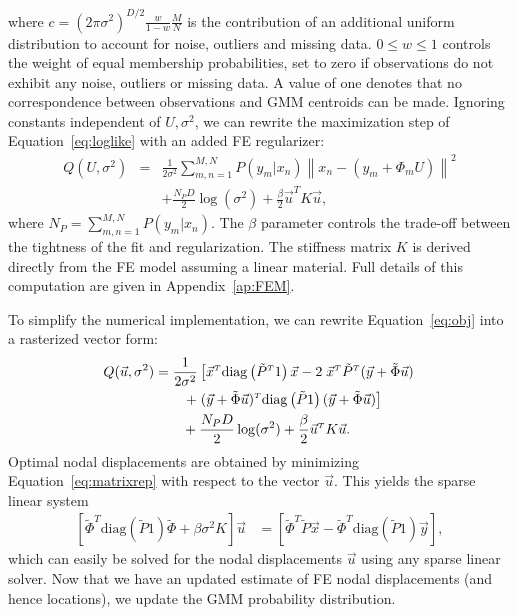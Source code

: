 \documentclass[journal]{IEEEtran}
\newcommand{\trans}[1]{#1^{\scriptscriptstyle T}}
\newcommand{\diag}{\mathrm{diag}}
\begin{document}
where $c=(2\pi\sigma^2)^{D/2}\frac{w}{1-w}\frac{M}{N}$ is the contribution of an additional uniform distribution to account for noise, outliers and missing data. $0{\leq}w{\leq}1$ controls the weight of equal membership probabilities, set to zero if observations do not exhibit any noise, outliers or missing data. A value of one denotes that no correspondence between observations and GMM centroids can be made. Ignoring constants independent of $U,\sigma^2$, we can rewrite the maximization step of Equation~\eqref{eq:loglike} with an added FE regularizer:
\begin{eqnarray} \label{eq:obj}
Q(U,\sigma^2) &=& \frac{1}{2\sigma^2}\sum_{m,n=1}^{M,N}P(y_m|x_n)\left\|x_n- (y_m+\Phi_mU)\right\|^2 \nonumber\\
&& + \frac{N_PD}{2}\log(\sigma^2) + \frac{\beta}{2}\trans{\vec{u}}K\vec{u},
\end{eqnarray}
where $N_P=\sum_{m,n=1}^{M,N}P(y_m|x_n)$. The $\beta$ parameter controls the trade-off between the tightness of the fit and regularization. The stiffness matrix $K$ is derived directly from the FE model assuming a linear material.  Full details of this computation are given in Appendix~\ref{ap:FEM}. 

To simplify the numerical implementation, we can rewrite Equation~\eqref{eq:obj} into a rasterized vector form:
\begin{align}\label{eq:matrixrep}
    Q(\vec{u},\sigma^2) & = \dfrac{1}{2\sigma^2}\left[ \trans{\vec{x}}\diag\left(\trans{\tilde{P}}1\right)\vec{x} -2\;\trans{\vec{x}}\trans{\tilde{P}}(\vec{y}+\tilde{\Phi}\vec{u}) \right.\notag\\
    & \qquad \left. +\;\trans{(\vec{y}+\tilde{\Phi}\vec{u})}\diag\left(\tilde{P}1\right)(\vec{y}+\tilde{\Phi}\vec{u}) \right]\notag\\
    & \qquad + \dfrac{N_PD}{2}\log(\sigma^2) + \dfrac{\beta}{2}\trans{\vec{u}}K\vec{u}.
\end{align}
Optimal nodal displacements are obtained by minimizing Equation~\eqref{eq:matrixrep} with respect to the vector $\vec{u}$. This yields the sparse linear system
\begin{align}\label{eq:Mstep}
        \left[\trans{\tilde{\Phi}}\diag\!\left(\tilde{P}1\right)\tilde{\Phi} 
            + \beta \sigma^2K\right] \vec{u} & = \left[\trans{\tilde{\Phi}}\tilde{P}\vec{x}
            -\trans{\tilde{\Phi}}\diag\!\left(\tilde{P}1\right)\vec{y}\right],
\end{align}
which can easily be solved for the nodal displacements $\vec{u}$ using any sparse linear solver.  Now that we have an updated estimate of FE nodal displacements (and hence locations), we update the GMM probability distribution.  
\end{document}
